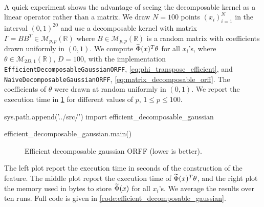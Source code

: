 \paragraph{}
A quick experiment shows the advantage of seeing the decomposable kernel as a linear operator rather than a matrix. We draw $N=100$ points $(x_i)_{i=1}^N$ in the interval $(0,1)^{20}$ and use a decomposable kernel with matrix $\Gamma=BB^T\in\mathcal{M}_{p,p}(\mathbb{R})$ where $B\in\mathcal{M}_{p,p}(\mathbb{R})$ is a random matrix with coefficients drawn uniformly in $(0,1)$. We compute $\widetilde{\Phi}(x)^T\theta$ for all $x_i$'s, where $\theta\in\mathcal{M}_{2D,1}(\mathbb{R})$, $D=100$, with the implementation \texttt{Ef\-fi\-cient\-De\-com\-po\-sa\-ble\-Gaus\-sian\-ORFF}, \cref{eq:phi_transpose_efficient}, and \texttt{Na\-ive\-De\-com\-po\-sa\-ble\-Gaus\-sian\-ORFF}, \cref{eq:matrix_decomposable_orff}. The coefficients of $\theta$ were drawn at random uniformly in $(0,1)$. We report the execution time in \cref{fig:efficient_decomposable_gaussian} for different values of $p$, $1\le p\le100$.
\begin{pycode}
sys.path.append('../src/')
import efficient_decomposable_gaussian

efficient_decomposable_gaussian.main()
\end{pycode}
\begin{figure}[htb]
\caption[Efficient decomposable gaussian \acs{ORFF}]{Efficient decomposable gaussian ORFF (lower is better).}
\label{fig:efficient_decomposable_gaussian}
\end{figure}
The left plot report the execution time in seconds of the construction of the feature. The middle plot report the execution time of $\widetilde{\Phi}(x)^T\theta$, and the right plot the memory used in bytes  to store $\widetilde{\Phi}(x)$ for all $x_i$'s. We average the results over ten runs. Full code is given in \cref{code:efficient_decomposable_gaussian}.

